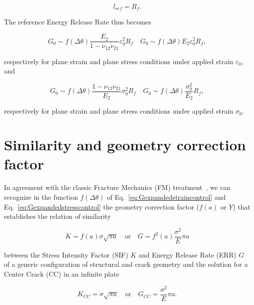\documentclass[a4paper,fleqn]{cas-dc}
\begin{document}
\begin{equation}\label{eq:lref}
l_{ref}=R_{f}.
\end{equation}

The reference Energy Release Rate thus becomes

\begin{equation}\label{eq:Gexpandedstraincontrol}
G_{0}\sim f\left(\Delta\theta\right)\frac{E_{2}}{1-\nu_{12}\nu_{21}}\varepsilon_{0}^{2}R_{f}\quad G_{0}\sim f\left(\Delta\theta\right)E_{2}\varepsilon_{0}^{2}R_{f},
\end{equation}

respectively for plane strain and plane stress conditions under applied strain $\varepsilon_{0}$, and

\begin{equation}\label{eq:Gexpandedstresscontrol}
G_{0}\sim f\left(\Delta\theta\right)\frac{1-\nu_{12}\nu_{21}}{E_{2}}\sigma_{0}^{2}R_{f}\quad G_{0}\sim f\left(\Delta\theta\right)\frac{\sigma_{0}^{2}}{E_{2}}R_{f},
\end{equation}

respectively for plane strain and plane stress conditions under applied strain $\sigma_{0}$.

\section{Similarity and geometry correction factor}

In agreement with the classic Fracture Mechanics (FM) treatment~\cite{Tada2000}, we can recognize in the function $f\left(\Delta\theta\right)$ of Eq.~\ref{eq:Gexpandedstraincontrol} and Eq.~\ref{eq:Gexpandedstresscontrol} the geometry correction factor ($f\left(a\right)$ or $Y$) that establishes the relation of similarity~\cite{Barenblatt2006}

\begin{equation}\label{eq:Gsim}
K=f\left(a\right)\sigma\sqrt{\pi a}\quad\text{or}\quad G=f^{2}\left(a\right)\frac{\sigma^{2}}{E}\pi a
\end{equation}

between the Stress Intensity Factor (SIF) $K$ and Energy Release Rate (ERR) $G$ of a generic configuration of structural and crack geometry and the solution for a Center Crack (CC) in an infinite plate

\begin{equation}\label{eq:Gsim}
K_{CC}=\sigma\sqrt{\pi a}\quad\text{or}\quad G_{CC}=\frac{\sigma^{2}}{E}\pi a.
\end{equation}
\end{document}

